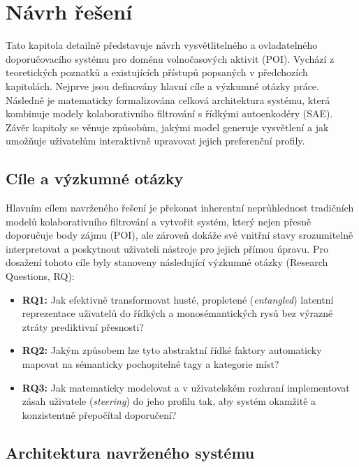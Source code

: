 \chapter{Návrh řešení}
\label{chap:navrh_reseni}

Tato kapitola detailně představuje návrh vysvětlitelného a ovladatelného doporučovacího systému pro doménu volnočasových aktivit (POI). Vychází z teoretických poznatků a existujících přístupů popsaných v předchozích kapitolách. Nejprve jsou definovány hlavní cíle a výzkumné otázky práce. Následně je matematicky formalizována celková architektura systému, která kombinuje modely kolaborativního filtrování s řídkými autoenkodéry (SAE). Závěr kapitoly se věnuje způsobům, jakými model generuje vysvětlení a jak umožňuje uživatelům interaktivně upravovat jejich preferenční profily.

\section{Cíle a výzkumné otázky}
\label{sec:cile_a_otazky}

Hlavním cílem navrženého řešení je překonat inherentní neprůhlednost tradičních modelů kolaborativního filtrování a vytvořit systém, který nejen přesně doporučuje body zájmu (POI), ale zároveň dokáže své vnitřní stavy srozumitelně interpretovat a poskytnout uživateli nástroje pro jejich přímou úpravu. Pro dosažení tohoto cíle byly stanoveny následující výzkumné otázky (Research Questions, RQ):

\begin{itemize}
    \item \textbf{RQ1:} Jak efektivně transformovat husté, propletené (\textit{entangled}) latentní reprezentace uživatelů do řídkých a monosémantických rysů bez výrazné ztráty prediktivní přesnosti?
    \item \textbf{RQ2:} Jakým způsobem lze tyto abstraktní řídké faktory automaticky mapovat na sémanticky pochopitelné tagy a kategorie míst?
    \item \textbf{RQ3:} Jak matematicky modelovat a v uživatelském rozhraní implementovat zásah uživatele (\textit{steering}) do jeho profilu tak, aby systém okamžitě a konzistentně přepočítal doporučení?
\end{itemize}

\section{Architektura navrženého systému}
\label{sec:architektura}

